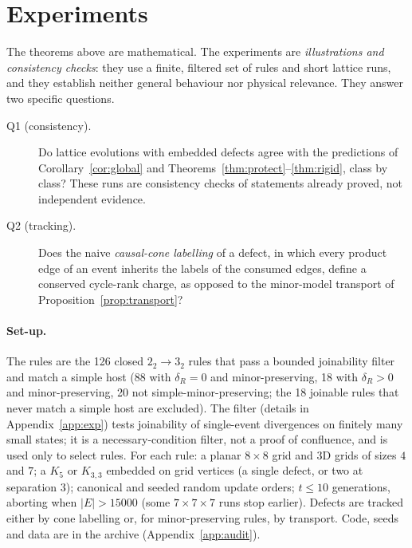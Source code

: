 \documentclass[10pt]{article}
\theoremstyle{definition}
\theoremstyle{plain}
\theoremstyle{remark}
\begin{document}
\section{Experiments}\label{sec:exp}
The theorems above are mathematical. The experiments are \emph{illustrations and consistency checks}: they use a finite, filtered set of rules and short lattice runs, and they establish neither general behaviour nor physical relevance. They answer two specific questions.
\begin{description}
\item[Q1 (consistency).] Do lattice evolutions with embedded defects agree with the predictions of Corollary~\ref{cor:global} and Theorems~\ref{thm:protect}--\ref{thm:rigid}, class by class? These runs are consistency checks of statements already proved, not independent evidence.
\item[Q2 (tracking).] Does the naive \emph{causal-cone labelling} of a defect, in which every product edge of an event inherits the labels of the consumed edges, define a conserved cycle-rank charge, as opposed to the minor-model transport of Proposition~\ref{prop:transport}?
\end{description}
\paragraph{Set-up.} The rules are the 126 closed $2_2\to3_2$ rules that pass a bounded joinability filter and match a simple host (88 with $\delta_R=0$ and minor-preserving, 18 with $\delta_R>0$ and minor-preserving, 20 not simple-minor-preserving; the 18 joinable rules that never match a simple host are excluded). The filter (details in Appendix~\ref{app:exp}) tests joinability of single-event divergences on finitely many small states; it is a necessary-condition filter, not a proof of confluence, and is used only to select rules. For each rule: a planar $8\times8$ grid and $3$D grids of sizes $4$ and $7$; a $K_5$ or $K_{3,3}$ embedded on grid vertices (a single defect, or two at separation $3$); canonical and seeded random update orders; $t\le10$ generations, aborting when $|E|>15000$ (some $7\times7\times7$ runs stop earlier). Defects are tracked either by cone labelling or, for minor-preserving rules, by transport. Code, seeds and data are in the archive (Appendix~\ref{app:audit}).
\end{document}

